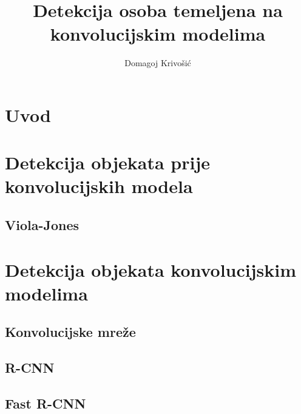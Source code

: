 \documentclass[times, utf8, diplomski]{fer}
\begin{document}

\title{Detekcija osoba temeljena na konvolucijskim modelima}

\author{Domagoj Krivošić}

\maketitle

\izvornik

\zahvala{}

\tableofcontents

\chapter{Uvod}


\chapter{Detekcija objekata prije konvolucijskih modela}


\section{Viola-Jones}


\chapter{Detekcija objekata konvolucijskim modelima}


\section{Konvolucijske mreže}



\section{R-CNN}


\section{Fast R-CNN}

\end{document}
